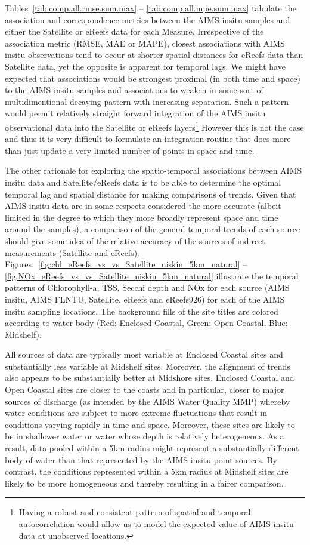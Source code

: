 Tables~\ref{tab:comp.all.rmse.sum.max} -- \ref{tab:comp.all.mpe.sum.max} tabulate the association
and correspondence metrics between the AIMS insitu samples and either the Satellite or eReefs data
for each Measure.  Irrespective of the association metric (RMSE, MAE or MAPE), closest associations
with AIMS insitu observations tend to occur at shorter spatial distances for eReefs data than
Satellite data, yet the opposite is apparent for temporal lags.  We might have expected that
associations would be strongest proximal (in both time and space) to the AIMS insitu samples and
associations to weaken in some sort of multidimentional decaying pattern with increasing separation.
Such a pattern would permit relatively straight forward integration of the AIMS insitu observational
data into the Satellite or eReefs layers\footnote{Having a robust and consistent pattern of spatial
and temporal autocorrelation would allow us to model the expected value of AIMS insitu data at
unobserved locations.}  However this is not the case and thus it is very difficult to formulate an
integration routine that does more than just update a very limited number of points in space and
time.

The other rationale for exploring the spatio-temporal associations between AIMS insitu data and
Satellite/eReefs data is to be able to determine the optimal temporal lag and spatial distance
for making comparisons of trends.  Given that AIMS insitu data are in some respects considered the
more accurate (albeit limited in the degree to which they more broadly represent space and time
around the samples), a comparison of the general temporal trends of each source should give some
idea of the relative accuracy of the sources of indirect measurements (Satellite and eReefs).
Figures.~\ref{fig:chl_eReefs_vs_vs_Satellite_niskin_5km_natural} --
\ref{fig:NOx_eReefs_vs_vs_Satellite_niskin_5km_natural} illustrate the temporal patterns of
Chlorophyll-a, TSS, Secchi depth and NOx for each source (AIMS insitu, AIMS FLNTU, Satellite, eReefs
and eReefs926) for each of the AIMS insitu sampling locations.  The background fills of the site
titles are colored according to water body (Red: Enclosed Coastal, Green: Open Coastal, Blue:
Midshelf).

All sources of data are typically most variable at Enclosed Coastal sites and substantially less
variable at Midshelf sites.  Moreover, the alignment of trends also appears to be substantially
better at Midshore sites.  Enclosed Coastal and Open Coastal sites are closer to the coasts and in
particular, closer to major sources of discharge (as intended by the AIMS Water Quality MMP) whereby
water conditions are subject to more extreme fluctuations that result in conditions varying rapidly
in time and space.  Moreover, these sites are likely to be in shallower water or water whose depth
is relatively heterogeneous. As a result, data pooled within a 5km radius might represent a
substantially different body of water than that represented by the AIMS insitu point sources.  By
contrast, the conditions represented within a 5km radius at Midshelf sites are likely to be more
homogeneous and thereby resulting in a fairer comparison.

